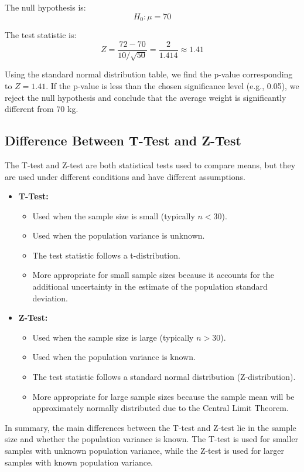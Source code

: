 \documentclass{article}
\begin{document}
The null hypothesis is:
\[
H_0: \mu = 70
\]

The test statistic is:
\[
Z = \frac{72 - 70}{10 / \sqrt{50}} = \frac{2}{1.414} \approx 1.41
\]

Using the standard normal distribution table, we find the p-value corresponding to \(Z = 1.41\). If the p-value is less than the chosen significance level (e.g., 0.05), we reject the null hypothesis and conclude that the average weight is significantly different from 70 kg.

\subsection{Difference Between T-Test and Z-Test}
The T-test and Z-test are both statistical tests used to compare means, but they are used under different conditions and have different assumptions.

\begin{itemize}
    \item \textbf{T-Test:}
    \begin{itemize}
        \item Used when the sample size is small (typically \(n < 30\)).
        \item Used when the population variance is unknown.
        \item The test statistic follows a t-distribution.
        \item More appropriate for small sample sizes because it accounts for the additional uncertainty in the estimate of the population standard deviation.
    \end{itemize}
    
    \item \textbf{Z-Test:}
    \begin{itemize}
        \item Used when the sample size is large (typically \(n > 30\)).
        \item Used when the population variance is known.
        \item The test statistic follows a standard normal distribution (Z-distribution).
        \item More appropriate for large sample sizes because the sample mean will be approximately normally distributed due to the Central Limit Theorem.
    \end{itemize}
\end{itemize}

In summary, the main differences between the T-test and Z-test lie in the sample size and whether the population variance is known. The T-test is used for smaller samples with unknown population variance, while the Z-test is used for larger samples with known population variance.
\end{document}

